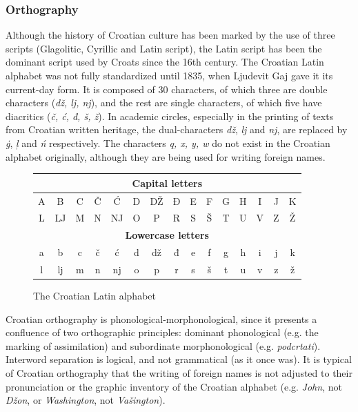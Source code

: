 \begin{multicols}{2}
\subsubsection{Orthography}

Although the history of Croatian culture has been marked by the use of three scripts (Glagolitic, Cyrillic and Latin script), the Latin script has been the dominant script used by Croats since the 16th century. The Croatian Latin alphabet was not fully standardized until 1835, when Ljudevit Gaj gave it its current-day form. It is composed of 30 characters, of which three are double characters (\emph{dž, lj, nj}), and the rest are single characters, of which five have diacritics (\emph{č, ć, đ, š, ž}). In academic circles, especially in the printing of texts from Croatian written heritage, the dual-characters \emph{dž}, \emph{lj} and \emph{nj}, are replaced by \emph{ģ}, \emph{ļ} and \emph{ń} respectively. The characters \emph{q, x, y, w} do not exist in the Croatian alphabet originally, although they are being used for writing foreign names.

\begin{figure}[htb]
\centering
	\begin{tabular} {|c|c|c|c|c|c|c|c|c|c|c|c|c|c|c|}
        \hline
        \multicolumn{15}{|c|}{\textbf{Capital letters}} \\ \hline
        A & B  & C & Č & Ć  & D & DŽ & Đ & E & F & G & H & I & J & K \\ \hline
        L & LJ & M & N & NJ & O & P  & R & S & Š & T & U & V & Z & Ž \\ \hline
        \multicolumn{15}{|c|}{\textbf{Lowercase letters}} \\ \hline
        a & b  & c & č & ć  & d & dž & đ & e & f & g & h & i & j & k \\ \hline
        l & lj & m & n & nj & o & p  & r & s & š & t & u & v & z & ž \\
        \hline
   \end{tabular}
  \caption{The Croatian Latin alphabet }
  \label{fig:abeceda_en}
\end{figure}

Croatian orthography is phonological-morphonological, since it presents a confluence of two orthographic principles: dominant phonological (e.g. the marking of assimilation) and subordinate morphonological (e.g. \emph{podcrtati}). Interword separation is logical, and not grammatical (as it once was). It is typical of Croatian orthography that the writing of foreign names is not adjusted to their pronunciation or the graphic inventory of the Croatian alphabet (e.g. \emph{John}, not \emph{Džon}, or \emph{Washington}, not \emph{Vašington}).


\end{multicols}
